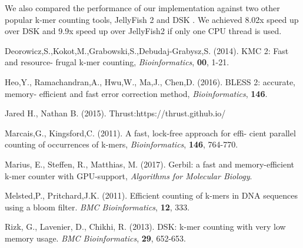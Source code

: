 \documentclass{bioinfo}
\begin{document}
We also compared the performance of our implementation against two other popular k-mer
counting tools, JellyFish 2 and DSK \citep{Rizk13}.
We achieved 8.02x speed up over DSK and 9.9x speed up over JellyFish2 if only one CPU
thread is used.

\begin{thebibliography}{}

Deorowicz,S.,Kokot,M.,Grabowski,S.,Debudaj-Grabysz,S. (2014). KMC 2: Fast and resource-
frugal k-mer counting, {\it Bioinformatics}, {\bf 00}, 1-21.

Heo,Y., Ramachandran,A., Hwu,W., Ma,J., Chen,D. (2016). BLESS 2: accurate, memory-
efficient and fast error correction method, {\it Bioinformatics}, {\bf 146}.

Jared H., Nathan B. (2015). Thrust:https://thrust.github.io/

Marcais,G., Kingsford,C. (2011).  A fast, lock-free approach for effi-
cient parallel counting of occurrences of k-mers, {\it Bioinformatics}, {\bf 146},
764-770.

Marius, E., Steffen, R., Matthias, M. (2017). Gerbil: a fast and memory-efficient k-mer
counter with GPU-support, {\it Algorithms for Molecular Biology}.

Melsted,P., Pritchard,J.K. (2011). Efficient counting of k-mers in DNA sequences
using a bloom filter. {\it BMC Bioinformatics}, {\bf 12}, 333.

Rizk, G., Lavenier, D., Chikhi, R. (2013). DSK: k-mer counting with very low memory usage.
{\it BMC Bioinformatics}, {\bf 29}, 652-653.

\end{thebibliography}
\end{document}

